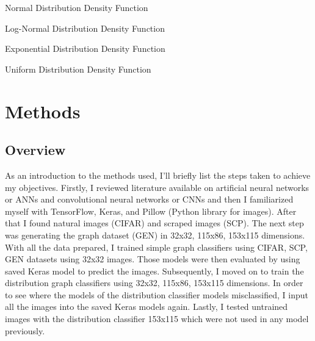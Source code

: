 \documentclass[12pt]{article}
\begin{document}
            Normal Distribution Density Function
            
            Log-Normal Distribution Density Function
            
            Exponential Distribution Density Function
            
            Uniform Distribution Density Function
        

    \newpage \section{Methods}

        \subsection{Overview}

            As an introduction to the methods used, I’ll briefly list the steps taken to achieve my objectives. 
            Firstly, I reviewed literature available on artificial neural networks or ANNs and convolutional neural networks 
            or CNNs and then I familiarized myself with TensorFlow, Keras, and Pillow (Python library for images). 
            After that I found natural images (CIFAR) and scraped images (SCP). 
            The next step was generating the graph dataset (GEN) in 32x32, 115x86, 153x115 dimensions. 
            With all the data prepared, I trained simple graph classifiers using CIFAR, SCP, GEN datasets using 32x32 images. 
            Those models were then evaluated by using saved Keras model to predict the images. 
            Subsequently, I moved on to train the distribution graph classifiers using 32x32, 115x86, 153x115 dimensions. 
            In order to see where the models of the distribution classifier models misclassified, 
            I input all the images into the saved Keras models again. 
            Lastly, I tested untrained images with the distribution classifier 153x115 which were not used in any model previously.
            
\end{document}
